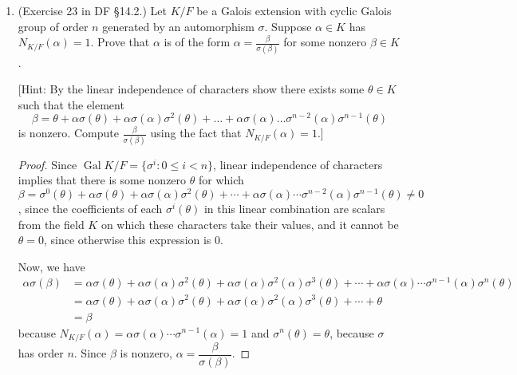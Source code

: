 \documentclass[10pt]{article}
\DeclareMathOperator*{\Aut}{Aut}
\DeclareMathOperator*{\Gal}{Gal}
\begin{document}
\begin{enumerate}
(c) Suppose that $\alpha \in K$ is of the form $\alpha = \beta - \sigma(\beta)$ for some $\beta \in K$.  Prove that $Tr_{K/F}(\alpha)=0$.

\begin{proof}
Again, $\sigma$ acts on $\Aut K/F$ as a permutation.  So
$$Tr_{K/F}(\sigma(\beta)) = \sum_{\tau \in \Gal K/F} \tau \circ \sigma(\beta) = \sum_{\tau \in \Gal K/F} \tau (\beta) = Tr_{K/F}(\beta).$$
Thus, $Tr_{K/F}(\alpha) = Tr_{K/F}(\beta - \sigma(\beta)) = Tr_{K/F}(\beta) - Tr_{K/F}(\sigma(\beta)) = Tr_{K/F}(\beta) - Tr_{K/F}(\beta) = 0$, since the trace is additive.
\end{proof}

\item (Exercise 23 in DF \S 14.2.) Let $K/F$ be a Galois extension with cyclic Galois group of order $n$ generated by an automorphism $\sigma$.  Suppose $\alpha \in K$ has $N_{K/F}(\alpha)=1$.  Prove that $\alpha$ is of the form $\alpha = \frac{\beta}{\sigma(\beta)}$ for some nonzero $\beta \in K$.

[Hint: By the linear independence of characters show there exists some $\theta \in K$ such that the element 
\[
\beta = \theta + \alpha \sigma(\theta) + \alpha \sigma(\alpha) \sigma^2(\theta) + \ldots + \alpha \sigma(\alpha) \ldots \sigma^{n-2}(\alpha) \sigma^{n-1}(\theta)
\]
is nonzero.  Compute $\frac{\beta}{\sigma(\beta)}$ using the fact that $N_{K/F}(\alpha)=1$.]

\begin{proof}
Since $\Gal K/F = \{\sigma^i : 0 \leq i < n \}$, linear independence of characters implies that there is some nonzero $\theta$ for which $\beta = \sigma^0(\theta) + \alpha \sigma(\theta) + \alpha \sigma(\alpha) \sigma^2(\theta) + \cdots + \alpha \sigma(\alpha) \cdots \sigma^{n-2}(\alpha) \sigma^{n-1}(\theta) \neq 0$, since the coefficients of each $\sigma^i(\theta)$ in this linear combination are scalars from the field $K$ on which these characters take their values, and it cannot be $\theta = 0$, since otherwise this expression is $0$.

Now, we have
\begin{align*}
\alpha \sigma(\beta) &= \alpha \sigma(\theta) + \alpha \sigma(\alpha) \sigma^2(\theta) + \alpha \sigma(\alpha) \sigma^2(\alpha) \sigma^3(\theta) + \cdots + \alpha \sigma(\alpha) \cdots \sigma^{n-1}(\alpha) \sigma^{n}(\theta)
\\
&= \alpha \sigma(\theta) + \alpha \sigma(\alpha) \sigma^2(\theta) + \alpha \sigma(\alpha) \sigma^2(\alpha) \sigma^3(\theta) + \cdots + \theta
\\
&= \beta
\end{align*}
because $N_{K/F}(\alpha) = \alpha \sigma(\alpha) \cdots \sigma^{n-1}(\alpha) = 1$ and $\sigma^n(\theta) = \theta$, because $\sigma$ has order $n$.  Since $\beta$ is nonzero, $\alpha = \dfrac{\beta}{\sigma(\beta)}$.
\end{proof}


\end{enumerate}
\end{document}
